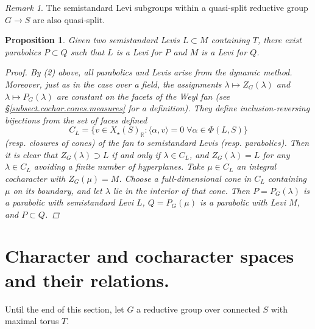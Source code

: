 \documentclass[openany]{amsbook}
\newtheorem{proposition}[theorem]{Proposition}
\theoremstyle{definition}
\theoremstyle{remark}
\newtheorem{remark}[theorem]{Remark}
\numberwithin{equation}{section}
\newcommand{\R}{\mathbb{R}}
\renewcommand{\-}{\operatorname{-}}
\begin{document}
\begin{remark}
    The semistandard Levi subgroups within a quasi-split reductive group $G \to S$ are also quasi-split.
\end{remark}

\begin{proposition}\label{prop.Levis.rel.standard.containment}
    Given two semistandard Levis $L \subset M$ containing $T$, there exist parabolics $P \subset Q$ such that $L$ is a Levi for $P$ and $M$ is a Levi for $Q$.
    \begin{proof}
        By (2) above, all parabolics and Levis arise from the dynamic method. Moreover, just as in the case over a field, the assignments $\lambda \mapsto Z_G(\lambda)$ and $\lambda \mapsto P_G(\lambda)$ are constant on the facets of the Weyl fan (see \S \ref{subsect.cochar.cones.measures} for a definition). They define inclusion-reversing bijections from the set of faces
        defined
        $$C_L = \{v \in X_\star(S)_{\R} : \langle \alpha, v \rangle =0 \; \forall \alpha \in \Phi(L, S)\}$$
        (resp. closures of cones) of the fan to semistandard Levis (resp. parabolics). Then it is clear that $Z_G(\lambda) \supset L$ if and only if $\lambda \in C_L$, and $Z_G(\lambda) = L$ for any $\lambda \in C_L$ avoiding a finite number of hyperplanes. Take $\mu \in C_L$ an integral cocharacter with $Z_G(\mu) = M$. Choose a full-dimensional cone in $C_L$ containing $\mu$ on its boundary, and let $\lambda$ lie in the interior of that cone. Then $P = P_G(\lambda)$ is a parabolic with semistandard Levi $L$, $Q = P_G(\mu)$ is a parabolic with Levi $M$, and $P \subset Q$. 
    \end{proof}
\end{proposition}





\section{Character and cocharacter spaces and their relations.}\label{subsect.char.cochar.spaces}

Until the end of this section, let $G$ a reductive group over connected $S$ with maximal torus $T$. 
\end{document}
